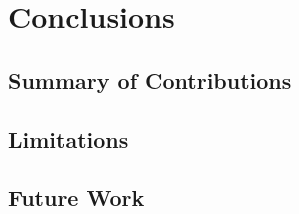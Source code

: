 \section{Conclusions}
\subsection{Summary of Contributions}
\subsection{Limitations}
\subsection{Future Work}
\clearpage